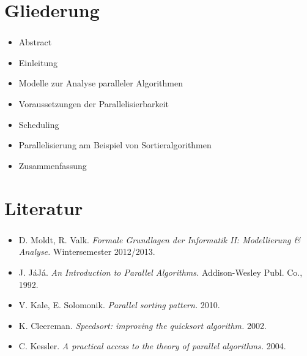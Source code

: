 
\section{Gliederung}
\label{sec:gliederung}

\begin{frame}
\frametitle{\insertsection} 
    \begin{itemize}
        \item Abstract
        \item Einleitung
        \item Modelle zur Analyse paralleler Algorithmen
        \item Voraussetzungen der Parallelisierbarkeit
        \item Scheduling
        \item Parallelisierung am Beispiel von Sortieralgorithmen
        \item Zusammenfassung
    \end{itemize}
\end{frame}


\section{Literatur}

\begin{frame}
    \frametitle{\insertsection}
    \begin{itemize}
        \item D. Moldt, R. Valk. \emph{Formale Grundlagen der Informatik II: Modellierung \& Analyse.} Wintersemester 2012/2013.
        \item J. J\'aJ\'a. \emph{An Introduction to Parallel Algorithms.} Addison-Wesley Publ. Co., 1992.
        \item V. Kale, E. Solomonik. \emph{Parallel sorting pattern.} 2010.
        \item K. Cleereman. \emph{Speedsort: improving the quicksort algorithm.} 2002.
        \item C. Kessler. \emph{A practical access to the theory of parallel algorithms.} 2004.
    \end{itemize}
\end{frame}


